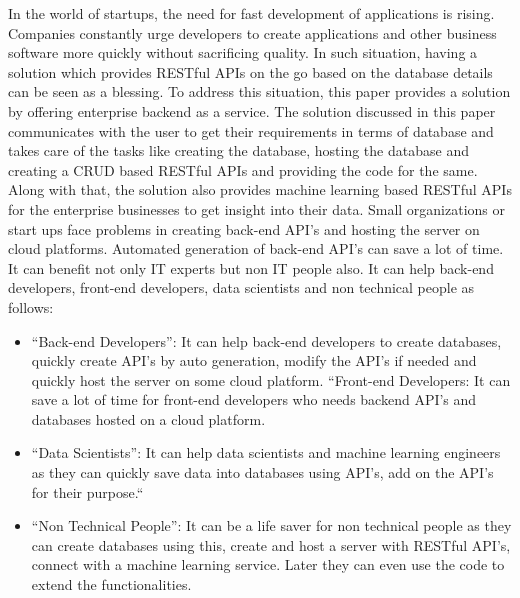 \documentclass[letterpaper, 10 pt, conference]{ieeeconf}
\begin{document}
In the world of startups, the need for fast development of applications is rising. Companies constantly urge developers to create applications and other business software more quickly without sacrificing quality. In such situation, having a solution which provides RESTful APIs on the go based on the database details can be seen as a blessing. To address this situation, this paper provides a solution by offering enterprise backend as a service. The solution discussed in this paper communicates with the user to get their requirements in terms of database and takes care of the tasks like creating the database, hosting the database and creating a CRUD based RESTful APIs and providing the code for the same. Along with that, the solution also provides machine learning based RESTful APIs for the enterprise businesses to get insight into their data. Small organizations or start ups face problems in creating back-end API’s and hosting the server on cloud platforms. Automated generation of back-end API’s can save a lot of time. It can benefit not only IT experts but non IT people also. It can help back-end developers, front-end developers, data scientists and non technical people as follows:
\begin{itemize}
\item``Back-end Developers'': It can help back-end developers to create databases, quickly create API’s by auto generation, modify the API’s if needed and quickly host the server on some cloud platform.
“Front-end Developers: It can save a lot of time for front-end developers who needs backend API’s and databases hosted on a cloud platform.
\item``Data Scientists'': It can help data scientists and machine learning engineers as they can quickly save data into databases using API’s, add on the API’s for their purpose.“
\item``Non Technical People'': It can be a life saver for non technical people as they can create databases using this, create and host a server with RESTful API’s, connect with a machine learning service. Later they can even use the code to extend the functionalities.

\end{itemize}
\end{document}
